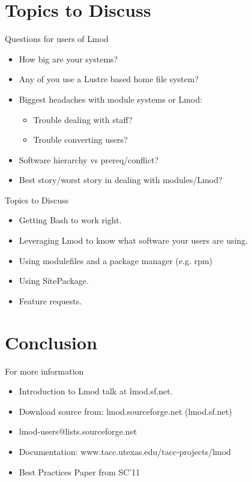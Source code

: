 \documentclass{beamer}
\begin{document}
\section{Topics to Discuss}

\begin{frame}{Questions for users of Lmod}
  \begin{itemize}
    \item How big are your systems?
    \item Any of you use a Lustre based home file system?
    \item Biggest headaches with module systems or Lmod:
      \begin{itemize}
        \item Trouble dealing with staff?
        \item Trouble converting users?
      \end{itemize}
    \item Software hierarchy vs prereq/conflict?
    \item Best story/worst story in dealing with modules/Lmod?
  \end{itemize}
\end{frame}

\begin{frame}{Topics to Discuss}
  \begin{itemize}
    \item Getting Bash to work right.
    \item Leveraging Lmod to know what software your users are using.
    \item Using modulefiles and a package manager (e.g. rpm)
    \item Using SitePackage.
    \item Feature requests.
  \end{itemize}
\end{frame}


\section{Conclusion}

\begin{frame}{For more information}
  \begin{itemize}
    \item Introduction to Lmod talk at lmod.sf.net.
    \item Download source from: lmod.sourceforge.net (lmod.sf.net)
    \item lmod-users@lists.sourceforge.net
    \item Documentation: www.tacc.utexas.edu/tacc-projects/lmod
    \item Best Practices Paper from SC'11
  \end{itemize}
\end{frame}
\end{document}
